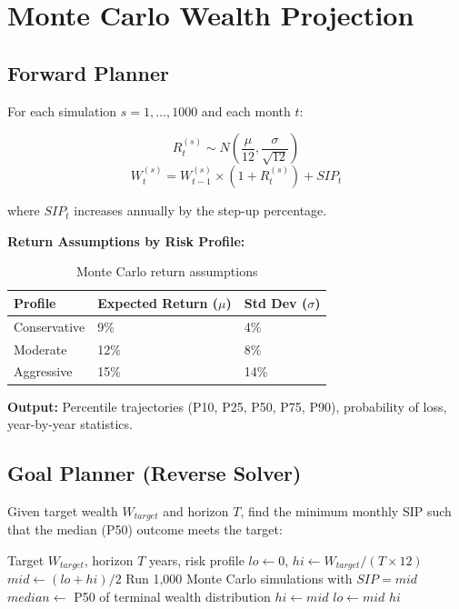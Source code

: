 \documentclass[12pt, a4paper, oneside]{report}
\begin{document}
\section{Monte Carlo Wealth Projection}
\label{sec:meth_montecarlo}

\subsection{Forward Planner}

For each simulation $s = 1, \ldots, 1000$ and each month $t$:

\begin{equation}
    R_t^{(s)} \sim N\left(\frac{\mu}{12}, \frac{\sigma}{\sqrt{12}}\right)
\end{equation}
\begin{equation}
    W_t^{(s)} = W_{t-1}^{(s)} \times (1 + R_t^{(s)}) + SIP_t
\end{equation}

where $SIP_t$ increases annually by the step-up percentage.

\textbf{Return Assumptions by Risk Profile:}
\begin{table}[H]
\centering
\caption{Monte Carlo return assumptions}
\label{tab:mc_assumptions}
\begin{tabular}{@{}lll@{}}
\toprule
\textbf{Profile} & \textbf{Expected Return ($\mu$)} & \textbf{Std Dev ($\sigma$)} \\
\midrule
Conservative & 9\% & 4\% \\
Moderate & 12\% & 8\% \\
Aggressive & 15\% & 14\% \\
\bottomrule
\end{tabular}
\end{table}

\textbf{Output:} Percentile trajectories (P10, P25, P50, P75, P90), probability of loss, year-by-year statistics.

\subsection{Goal Planner (Reverse Solver)}

Given target wealth $W_{target}$ and horizon $T$, find the minimum monthly SIP such that the median (P50) outcome meets the target:

\begin{algorithm}[H]
\caption{Goal-Based SIP Solver via Binary Search}
\label{alg:goal_solver}
\begin{algorithmic}[1]
\REQUIRE Target $W_{target}$, horizon $T$ years, risk profile
\STATE $lo \leftarrow 0$, $hi \leftarrow W_{target} / (T \times 12)$
    \STATE $mid \leftarrow (lo + hi) / 2$
    \STATE Run 1,000 Monte Carlo simulations with $SIP = mid$
    \STATE $median \leftarrow$ P50 of terminal wealth distribution
        \STATE $hi \leftarrow mid$
    \ELSE
        \STATE $lo \leftarrow mid$
    \ENDIF
\ENDWHILE
\RETURN $hi$
\end{algorithmic}
\end{algorithm}
\end{document}
